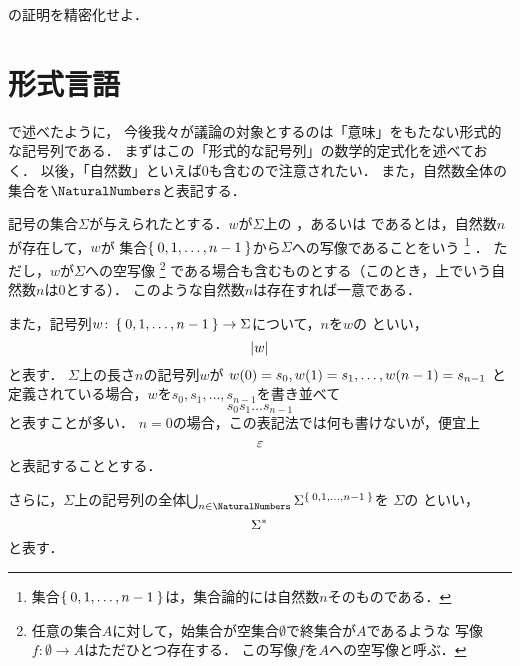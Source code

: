 \begin{Que} \label{que:proofinductivedefinition}
	の証明を精密化せよ．
\end{Que}

\section{形式言語} \label{sec:formallanguage}

で述べたように，
今後我々が議論の対象とするのは「意味」をもたない形式的な記号列である．
まずはこの「形式的な記号列」の数学的定式化を述べておく．
以後，「自然数」といえば0も含むので注意されたい．%
%
また，自然数全体の集合を\(\NaturalNumbers\)と表記する．

\begin{Def} \label{Def:formallanguage}
	記号の集合\(\Sigma\)が与えられたとする．\(w\)が\(\Sigma\)上の%
	，あるいは%
	であるとは，自然数\(n\)が存在して，\(w\)が
	集合\(\Set{0, 1, \dots, n-1}\)から\(\Sigma\)への写像であることをいう%
	\footnote{%
		集合\(\Set{0,1,\dots, n-1}\)は，集合論的には自然数\(n\)そのものである．
	}%
	．
	ただし，\(w\)が\(\Sigma\)への空写像%
	\footnote{%
		任意の集合\(A\)に対して，始集合が空集合\(\emptyset\)で終集合が\(A\)であるような
		写像\(f \colon \emptyset \to A\)はただひとつ存在する．%
		この写像\(f\)を\(A\)への空写像と呼ぶ．
	}%
	である場合も含むものとする（このとき，上でいう自然数\(n\)は0とする）．
	このような自然数\(n\)は存在すれば一意である．

	また，記号列\(w \colon \Set{0, 1, \dots, n-1} \to \Sigma\)について，\(n\)を\(w\)の%
	といい，%
	\begin{equation}
		\length{w}
		\label{eq:lengthforstring}
	\end{equation}
	と表す．
	\(\Sigma\)上の長さ\(n\)の記号列\(w\)が
	\(\apply{w}{0} = s_0, \apply{w}{1} = s_1, \dots, \apply{w}{n-1} = s_{n-1}\)
	と定義されている場合，\(w\)を\(s_0, s_1, \dots, s_{n-1}\)を書き並べて%
	\begin{equation}
		s_0 s_1 \dots s_{n-1}
	\end{equation}
	と表すことが多い．
	\(n = 0\)の場合，この表記法では何も書けないが，便宜上%
	\begin{equation}
		\varepsilon
		\label{eq:emptystring}
	\end{equation}
	と表記することとする．

	さらに，\(\Sigma\)上の記号列の全体\(\bigcup_{n \in \NaturalNumbers} \Sigma^{\Set{0,1,\dots, n-1}}\)を
	\(\Sigma\)の%
	といい，%
	\begin{equation}
		{\Sigma}^{\ast}
		\label{eq:KleeneClosure}
	\end{equation}
	と表す．
\end{Def}

